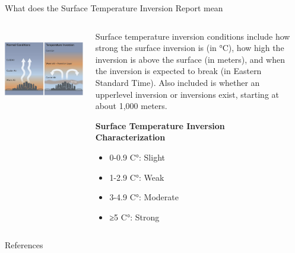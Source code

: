 \documentclass[final]{beamer}
\newlength{\sepwidth}
\newlength{\colwidth}
\newcommand{\separatorcolumn}{\begin{column}{\sepwidth}\end{column}}
\begin{document}
\begin{frame}[t]
\begin{columns}[t]
\begin{column}{\colwidth}
\begin{block}{What does the Surface Temperature Inversion Report mean}
    \begin{columns}[T]
    \begin{column}{0.33\linewidth}
    ~\includegraphics[width=1\textwidth]{citypic.png}
    \end{column}
    \begin{column}{0.6\linewidth}
    
        Surface temperature inversion conditions include how strong the surface inversion is (in °C), how high the inversion is above the surface (in meters), and when the inversion is expected to break (in Eastern Standard Time). Also included is whether an upperlevel inversion or inversions exist, starting at about 1,000 meters.
        
        \textbf{Surface Temperature Inversion Characterization}
            \begin{itemize}
              \item 0-0.9 C°: Slight
              \item 1-2.9 C°: Weak
              \item 3-4.9 C°: Moderate
              \item ≥5 C°: Strong
            \end{itemize}
    \end{column}
    \end{columns}    


  \end{block}



  \begin{block}{References}

    \nocite{*}
    \footnotesize{}

  \end{block}

\end{column}

\separatorcolumn
\end{columns}
\end{frame}
\end{document}
